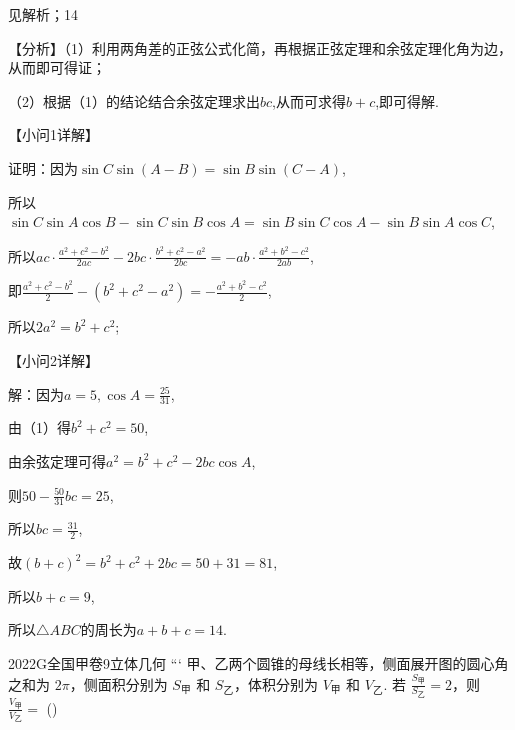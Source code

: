 \documentclass[12pt,UTF-8,a4paper]{ctexart}
\numberwithin{figure}{section}
\theoremstyle{mystyle}
\theoremstyle{mystylekaishu}
\theoremstyle{mystyle}
\numberwithin{xiti}{section}
\begin{document}
\begin{answer}
见解析；14
\end{answer}

\begin{solutions}
【分析】（1）利用两角差的正弦公式化简，再根据正弦定理和余弦定理化角为边，从而即可得证；

（2）根据（1）的结论结合余弦定理求出$bc$,从而可求得$b+c$,即可得解.

【小问1详解】

证明：因为$\sin C\sin(A-B)=\sin B\sin(C-A)$,

所以$\sin C\sin A\cos B-\sin C\sin B\cos A=\sin B\sin C\cos A-\sin B\sin A\cos C$,

所以$ac\cdot\frac{a^2+c^2-b^2}{2ac}-2bc\cdot\frac{b^2+c^2-a^2}{2bc}=-ab\cdot\frac{a^2+b^2-c^2}{2ab}$,

即$\frac{a^2+c^2-b^2}{2}-\left(b^2+c^2-a^2\right)=-\frac{a^2+b^2-c^2}{2}$,

所以$2a^2=b^2+c^2$;

【小问2详解】

解：因为$a=5,\cos A=\frac{25}{31}$,

由（1）得$b^2+c^2=50$,

由余弦定理可得$a^2=b^2+c^2-2bc\cos A$,

则$50-\frac{50}{31}bc=25$,

所以$bc=\frac{31}{2}$,

故$(b+c)^2=b^2+c^2+2bc=50+31=81$,

所以$b+c=9$,

所以$\triangle ABC$的周长为$a+b+c=14$.
\end{solutions}


\begin{problem}{2022}{G}{全国甲卷}{9}{立体几何}
```
甲、乙两个圆锥的母线长相等，侧面展开图的圆心角之和为 $2 \pi$，侧面积分别为 $S_{\text{甲}}$ 和 $S_{\text{乙}}$，体积分别为 $V_{\text{甲}}$ 和 $V_{\text{乙}}$. 若 $\frac{S_{\text{甲}}}{S_{\text{乙}}}=2$，则 $\frac{V_{\text{甲}}}{V_{\text{乙}}}=$ (\hspace{1cm})
\begin{choices}
\end{choices}
\end{problem}
\end{document}
